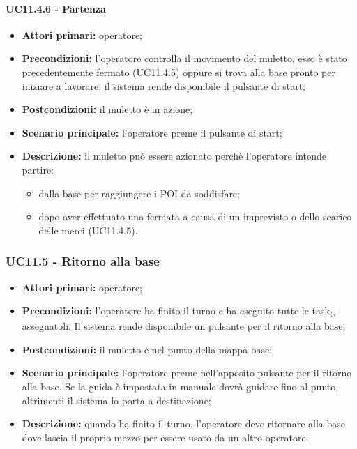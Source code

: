 \paragraph{UC11.4.6 - Partenza}
\begin{itemize}
	\item 	\textbf{Attori primari:} operatore;
	\item 	\textbf{Precondizioni:} l'operatore controlla il movimento del muletto, esso è stato precedentemente fermato (UC11.4.5) oppure si trova alla base pronto per iniziare a lavorare; il sistema rende disponibile il pulsante di start;
	\item 	\textbf{Postcondizioni:} il muletto è in azione;
	\item 	\textbf{Scenario principale:} l'operatore preme il pulsante di start;
	\item 	\textbf{Descrizione:} il muletto può essere azionato perchè l'operatore intende partire:
	\begin{itemize}
		\item dalla base per raggiungere i POI da soddisfare;
		\item dopo aver effettuato una fermata a causa di un imprevisto o dello scarico delle merci (UC11.4.5).
	\end{itemize}
\end{itemize}


\subsubsection{UC11.5 - Ritorno alla base}
\begin{itemize}
	\item 	\textbf{Attori primari:} operatore;
	\item 	\textbf{Precondizioni:} l'operatore ha finito il turno e ha eseguito tutte le task\textsubscript{G} assegnatoli. Il sistema rende disponibile un pulsante per il ritorno alla base;
	\item 	\textbf{Postcondizioni:} il muletto è nel punto della mappa base;
	\item 	\textbf{Scenario principale:} l'operatore preme nell'apposito pulsante per il ritorno alla base. Se la guida è impostata in manuale dovrà guidare fino al punto, altrimenti il sistema lo porta a destinazione;
	\item 	\textbf{Descrizione:} quando ha finito il turno, l'operatore deve ritornare alla base dove lascia il proprio mezzo per essere usato da un altro operatore.
\end{itemize}

